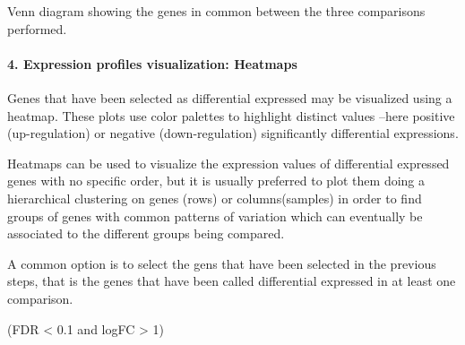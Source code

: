 \documentclass[]{article}
\let\oldparagraph\paragraph
\renewcommand{\paragraph}[1]{\oldparagraph{#1}\mbox{}}
\begin{document}
Venn diagram showing the genes in common between the three comparisons
performed.

\paragraph{4. Expression profiles visualization:
Heatmaps}\label{expression-profiles-visualization-heatmaps}

Genes that have been selected as differential expressed may be
visualized using a heatmap. These plots use color palettes to highlight
distinct values --here positive (up-regulation) or negative
(down-regulation) significantly differential expressions.

Heatmaps can be used to visualize the expression values of differential
expressed genes with no specific order, but it is usually preferred to
plot them doing a hierarchical clustering on genes (rows) or
columns(samples) in order to find groups of genes with common patterns
of variation which can eventually be associated to the different groups
being compared.

A common option is to select the gens that have been selected in the
previous steps, that is the genes that have been called differential
expressed in at least one comparison.

(FDR \textless{} 0.1 and logFC \textgreater{} 1)
\end{document}
